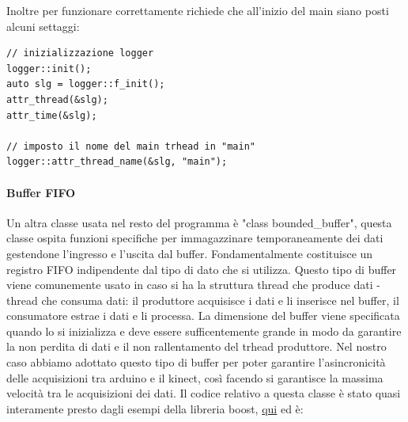\documentclass[10pt,a4paper]{article}
\begin{document}
Inoltre per funzionare correttamente richiede che all'inizio del main siano posti alcuni settaggi:
\begin{lstlisting}[style=mycpp, caption=inizializzazione del logger, captionpos=b]
// inizializzazione logger
logger::init();
auto slg = logger::f_init();
attr_thread(&slg);
attr_time(&slg);

// imposto il nome del main trhead in "main"
logger::attr_thread_name(&slg, "main");
\end{lstlisting}
%
%
\paragraph{Buffer FIFO}
Un altra classe usata nel resto del programma \`e "class bounded\_buffer", questa classe ospita funzioni specifiche per immagazzinare temporaneamente dei dati gestendone l'ingresso e l'uscita dal buffer. Fondamentalmente costituisce un registro FIFO indipendente dal tipo di dato che si utilizza. Questo tipo di buffer viene comunemente usato in caso si ha la struttura thread che produce dati - thread che consuma dati: il produttore acquisisce i dati e li inserisce nel buffer, il consumatore estrae i dati e li processa. La dimensione del buffer viene specificata quando lo si inizializza e deve essere sufficentemente grande in modo da garantire la non perdita di dati e il non rallentamento del trhead produttore. Nel nostro caso abbiamo adottato questo tipo di buffer per poter garantire l'asincronicit\`a delle acquisizioni tra arduino e il kinect, cos\`i facendo si garantisce la massima velocit\`a tra le acquisizioni dei dati. Il codice relativo a questa classe \`e stato quasi interamente presto dagli esempi della libreria boost, \href{https://www.boost.org/doc/libs/1_69_0/doc/html/circular_buffer/examples.html}{qui} ed \`e:
\end{document}
